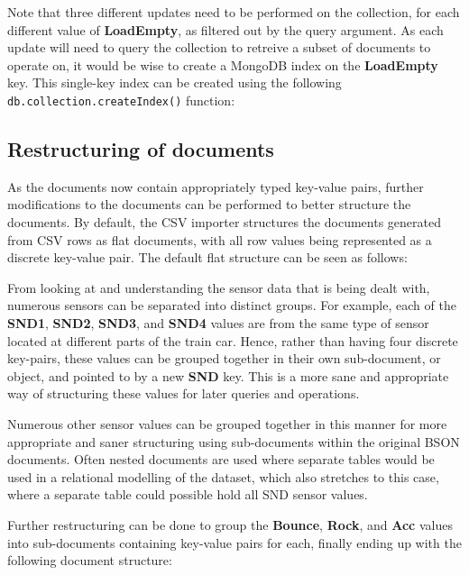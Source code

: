 \documentclass[a4paper,11pt]{article}
\begin{document}

Note that three different updates need to be performed on the collection, for each different value of \textbf{LoadEmpty},
as filtered out by the query argument. As each update will need to query the collection to retreive a subset of documents
to operate on, it would be wise to create a MongoDB index on the \textbf{LoadEmpty} key. This single-key index can be
created using the following \texttt{db.collection.createIndex()} function:




\subsection{Restructuring of documents} %
\label{sub:restructuring_of_documents}

As the documents now contain appropriately typed key-value pairs, further modifications to the documents can be performed
to better structure the documents. By default, the CSV importer structures the documents generated from CSV rows as flat
documents, with all row values being represented as a discrete key-value pair. The default flat structure can be seen as
follows:


From looking at and understanding the
sensor data that is being dealt with, numerous sensors can be separated into distinct groups. For example, each of the
\textbf{SND1}, \textbf{SND2}, \textbf{SND3}, and \textbf{SND4} values are from the same type of sensor located at different
parts of the train car. Hence, rather than having four discrete key-pairs, these values can be grouped together in their
own sub-document, or object, and pointed to by a new \textbf{SND} key. This is a more sane and appropriate way of
structuring these values for later queries and operations.

Numerous other sensor values can be grouped together in this manner for more appropriate and saner structuring using
sub-documents within the original BSON documents. Often nested documents are used where separate tables would be used in
a relational modelling of the dataset, which also stretches to this case, where a separate table could possible hold all
SND sensor values.

Further restructuring can be done to group the \textbf{Bounce}, \textbf{Rock}, and \textbf{Acc} values into sub-documents
containing key-value pairs for each, finally ending up with the following document structure:
\end{document}
